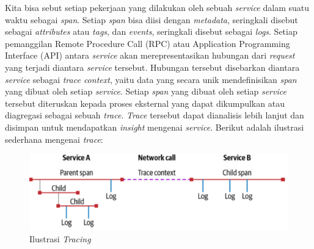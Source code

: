 Kita bisa sebut setiap pekerjaan yang dilakukan oleh sebuah \textit{service} dalam suatu waktu sebagai \textit{span}.
Setiap \textit{span} bisa diisi dengan \textit{metadata}, seringkali disebut sebagai \textit{attributes} atau \textit{tags}, dan \textit{events}, seringkali disebut sebagai \textit{logs}.
Setiap pemanggilan Remote Procedure Call (RPC) atau Application Programming Interface (API) antara \textit{service} akan merepresentasikan hubungan dari \textit{request} yang terjadi diantara \textit{service} tersebut.
Hubungan tersebut disebarkan diantara \textit{service} sebagai \textit{trace context}, yaitu data yang secara unik mendefinisikan \textit{span} yang dibuat oleh setiap \textit{service}.
Setiap \textit{span} yang dibuat oleh setiap \textit{service} tersebut diteruskan kepada proses eksternal yang dapat dikumpulkan atau diagregasi sebagai sebuah \textit{trace}.
\textit{Trace} tersebut dapat dianalisis lebih lanjut dan disimpan untuk mendapatkan \textit{insight} mengenai \textit{service}.
Berikut adalah ilustrasi sederhana mengenai \textit{trace}:
\begin{figure}[htb]
      \centering
      \includegraphics[width=1\textwidth]{resources/ch2/tracing-illus.png}
      \caption{Ilustrasi \textit{Tracing} \citep{parker2020distributed}}
      \label{ch2-trace-illus}
\end{figure}

